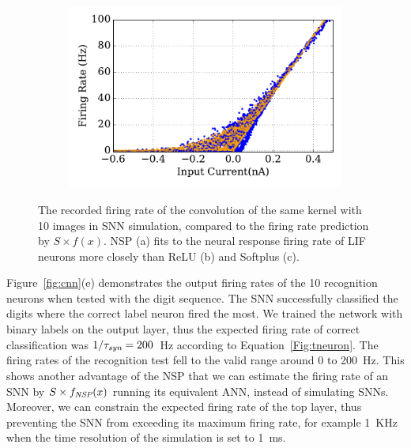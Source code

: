 \begin{figure}[tbh!]
\begin{subfigure}[t]{0.6\textwidth}
\DIFdelendFL \DIFaddbeginFL \includegraphics[width=\textwidth]{pics_iconip/revise_6-5-3.pdf}
		\DIFaddendFL \end{subfigure}
		\caption[The recorded firing rate of the convolution outcomes.]{
			The recorded firing rate of the convolution of the same kernel with 10 images in SNN simulation, compared to the firing rate prediction by $S \times f(x)$.
			NSP (a) fits to the neural response firing rate of LIF neurons more closely than ReLU (b) and Softplus (c).}
		\label{fig:af_compare}
	\end{figure}

	Figure~\ref{fig:cnn}(e) demonstrates the output firing rates of the 10 recognition neurons when tested with the digit sequence.
	The SNN successfully classified the digits where the correct label neuron fired the most.
	We trained the network with binary labels on the output layer, thus the expected firing rate of correct classification was $1/\tau_{\textit{\textrm{syn}}}=200$~Hz according to Equation~\ref{Fig:tneuron}.
	The firing rates of the recognition test fell to the valid range around 0 to 200~Hz.
	This shows another advantage of the NSP that we can estimate the firing rate of an SNN by $S \times f_{\textit{\textrm{NSP}}}(x)$ running its equivalent ANN, instead of simulating SNNs.
	Moreover, we can constrain the expected firing rate of the top layer, thus preventing the SNN from exceeding its maximum firing rate, for example 1~KHz when the time resolution of the simulation is set to 1~ms.

